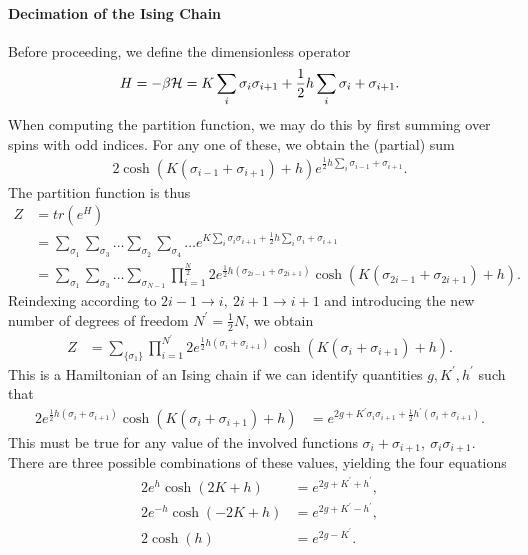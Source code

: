 \paragraph{Decimation of the Ising Chain}
Before proceeding, we define the dimensionless operator
\begin{align*}
	H = -\beta\mathcal{H} = K\sum\limits_{i}\sigma_{i}\sigma_{i + 1} + \frac{1}{2}h\sum\limits_{i}\sigma_{i} + \sigma_{i + 1}.
\end{align*}
When computing the partition function, we may do this by first summing over spins with odd indices. For any one of these, we obtain the (partial) sum
\begin{align*}
	2\cosh(K(\sigma_{i - 1} + \sigma_{i + 1}) + h)e^{\frac{1}{2}h\sum\limits_{i}\sigma_{i - 1} + \sigma_{i + 1}}.
\end{align*}
The partition function is thus
\begin{align*}
	Z &= tr(e^{H}) \\
	  &= \sum\limits_{\sigma_{1}}\sum\limits_{\sigma_{3}}\dots\sum\limits_{\sigma_{2}}\sum\limits_{\sigma_{4}}\dots e^{K\sum\limits_{i}\sigma_{i}\sigma_{i + 1} + \frac{1}{2}h\sum\limits_{i}\sigma_{i} + \sigma_{i + 1}} \\
	  &= \sum\limits_{\sigma_{1}}\sum\limits_{\sigma_{3}}\dots\sum\limits_{\sigma_{N - 1}}\prod\limits_{i = 1}^{\frac{N}{2}}2e^{\frac{1}{2}h(\sigma_{2i - 1} + \sigma_{2i + 1})}\cosh(K(\sigma_{2i - 1} + \sigma_{2i + 1}) + h).
\end{align*}
Reindexing according to $2i - 1 \to i,\ 2i + 1 \to i + 1$ and introducing the new number of degrees of freedom $N^{\prime} = \frac{1}{2}N$, we obtain
\begin{align*}
	Z &= \sum\limits_{\{\sigma_{1}\}}\prod\limits_{i = 1}^{N^{\prime}}2e^{\frac{1}{2}h(\sigma_{i} + \sigma_{i + 1})}\cosh(K(\sigma_{i} + \sigma_{i + 1}) + h).
\end{align*}
This is a Hamiltonian of an Ising chain if we can identify quantities $g, K^{\prime}, h^{\prime}$ such that
\begin{align*}
	2e^{\frac{1}{2}h(\sigma_{i} + \sigma_{i + 1})}\cosh(K(\sigma_{i} + \sigma_{i + 1}) + h) &= e^{2g + K^{\prime}\sigma_{i}\sigma_{i + 1} + \frac{1}{2}h^{\prime}(\sigma_{i} + \sigma_{i + 1})}.
\end{align*}
This must be true for any value of the involved functions $\sigma_{i} + \sigma_{i + 1},\ \sigma_{i}\sigma_{i + 1}$. There are three possible combinations of these values, yielding the four equations
\begin{align*}
	2e^{h}\cosh(2K + h)   &= e^{2g + K^{\prime} + h^{\prime}}, \\
	2e^{-h}\cosh(-2K + h) &= e^{2g + K^{\prime} - h^{\prime}}, \\
	2\cosh(h)             &= e^{2g - K^{\prime}}.
\end{align*}
